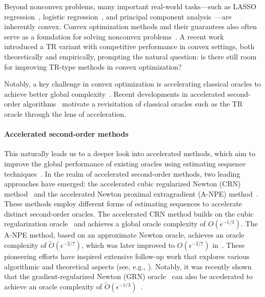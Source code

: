 \documentclass{article}
\begin{document}
Beyond nonconvex problems, many important real-world tasks—such as LASSO regression~\cite{ranstam2018lasso}, logistic regression~\cite{lavalley2008logistic}, and principal component analysis~\cite{abdi2010principal}—are inherently convex. Convex optimization methods and their guarantees also often serve as a foundation for solving nonconvex problems~\cite{carmon2017convex,carmon2018accelerated,li2023restarted}. A recent work~\cite{jiang2024nonconvexityuniversaltrustregionmethod} introduced a TR variant with competitive performance in convex settings, both theoretically and empirically, prompting the natural question: is there still room for improving TR-type methods in convex optimization?

Notably, a key challenge in convex optimization is accelerating classical oracles to achieve better global complexity~\cite{nesterovMethodSolvingConvex1983a,nesterov_lectures_2018}. Recent developments in accelerated second-order algorithms~\cite{nesterov2008accelerating, monteiro2013accelerated, doikov2020contracting, carmon2022optimal, NEURIPS2022_e56f394b} motivate a revisitation of classical oracles such as the TR oracle through the lens of acceleration.

\paragraph{Accelerated second-order methods}

This naturally leads us to a deeper look into accelerated methods, which aim to improve the global performance of existing oracles using estimating sequence techniques~\cite{baesEstimateSequenceMethods2009a,nesterov_lectures_2018}. In the realm of accelerated second-order methods, two leading approaches have emerged: the accelerated cubic regularized Newton (CRN) method~\cite{nesterov2008accelerating} and the accelerated Newton proximal extragradient (A-NPE) method~\cite{monteiro2013accelerated}. These methods employ different forms of estimating sequences to accelerate distinct second-order oracles. The accelerated CRN method builds on the cubic regularization oracle~\cite{nesterov2006cubic} and achieves a global oracle complexity of $O(\epsilon^{-1/3})$. The A-NPE method, based on an approximate Newton oracle, achieves an oracle complexity of $\tilde{O}(\epsilon^{-2/7})$, which was later improved to $O(\epsilon^{-2/7})$ in~\cite{carmon2022optimal,NEURIPS2022_e56f394b}. These pioneering efforts have inspired extensive follow-up work that explores various algorithmic and theoretical aspects (see, e.g., \cite{jiang2021optimal,chen2022accelerating,lin2022explicit,agafonov2023inexact,agafonov2024advancing,jiang2024accelerated,huang2024inexact}). Notably, it was recently shown that the gradient-regularized Newton (GRN) oracle~\cite{mishchenko_regularized_2023} can also be accelerated to achieve an oracle complexity of $\tilde{O}(\epsilon^{-1/3})$~\cite{doikov2020contracting}.
\end{document}
